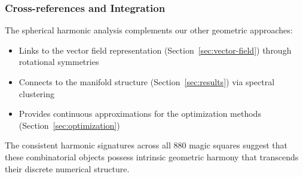 \subsubsection{Cross-references and Integration}

The spherical harmonic analysis complements our other geometric approaches:
\begin{itemize}
    \item Links to the vector field representation (Section~\ref{sec:vector-field}) through rotational symmetries
    \item Connects to the manifold structure (Section~\ref{sec:results}) via spectral clustering
    \item Provides continuous approximations for the optimization methods (Section~\ref{sec:optimization})
\end{itemize}

The consistent harmonic signatures across all 880 magic squares suggest that these combinatorial objects possess intrinsic geometric harmony that transcends their discrete numerical structure. 